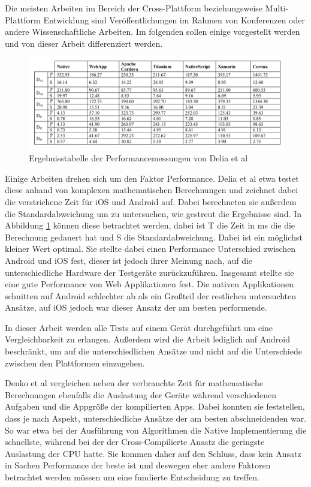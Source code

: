 Die meisten Arbeiten im Bereich  der Cross-Plattform beziehungsweise Multi-Plattform Entwicklung sind Veröffentlichungen im Rahmen von Konferenzen oder andere Wissenschaftliche Arbeiten. Im folgenden sollen einige vorgestellt werden und von dieser Arbeit differenziert werden.

\begin{figure}[ht]
  \centering
  \includegraphics[width=\textwidth,keepaspectratio]{images/IEEE_Delia_Al.png}
  \caption[Ergebnisstabelle der Performancemessungen von Delia et al]{Ergebnisstabelle der Performancemessungen von Delia et al \cite{IEEE_development_classes}}
  \label{fig:result_table_IEEE_related_work}
\end{figure}

Einige Arbeiten drehen sich um den Faktor Performance. Delia et al \cite{IEEE_development_classes} etwa testet diese anhand von komplexen mathematischen Berechnungen und zeichnet dabei die verstrichene Zeit für iOS und Android auf. Dabei berechneten sie außerdem die Standardabweichung um zu untersuchen, wie gestreut die Ergebnisse sind. In Abbildung \ref{fig:result_table_IEEE_related_work} können diese betrachtet werden, dabei ist T die Zeit in ms die die Berechnung gedauert hat und S die Standardabweichung. Dabei ist ein möglichst kleiner Wert optimal. Sie stellte dabei einen Performance Unterschied zwischen Android und iOS fest, dieser ist jedoch ihrer Meinung nach, auf die unterschiedliche Hardware der Testgeräte zurückzuführen. Insgesamt stellte sie eine gute Performance von Web Applikationen fest. Die nativen Applikationen schnitten auf Android schlechter ab als ein Großteil der restlichen untersuchten Ansätze, auf iOS jedoch war dieser Ansatz der am besten performende.

In dieser Arbeit werden alle Tests auf einem Gerät durchgeführt um eine Vergleichbarkeit zu erlangen. Außerdem wird die Arbeit lediglich auf Android beschränkt, um auf die unterschiedlichen Ansätze und nicht auf die Unterschiede zwischen den Plattformen einzugehen.
 
Denko et al \cite{Denko_performance} vergleichen neben der verbrauchte Zeit für mathematische Berechnungen ebenfalls die Auslastung der Geräte während verschiedenen Aufgaben und die Appgröße der kompilierten Apps. Dabei konnten sie feststellen, dass je nach Aspekt, unterschiedliche Ansätze der am besten abschneidenden war. So war etwa bei der Ausführung von Algorithmen die Native Implementierung die schnellste, während bei der der Cross-Compilierte Ansatz die geringste Auslastung der CPU hatte. Sie kommen daher auf den Schluss, dass kein Ansatz in Sachen Performance der beste ist und deswegen eher andere Faktoren betrachtet werden müssen um eine fundierte Entscheidung zu treffen.

